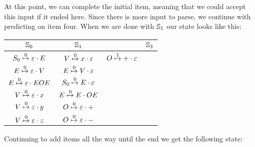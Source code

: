 		At this point, we can complete the initial item, meaning that we could 
		accept this input if it ended here. Since there is more input to parse,
		we continue with predicting on item four. When we are done with 
		$\St{1}$ our state looks like this:

		\begin{table}[H]
		\centering
		\begin{tabular}{|c|c|c|c|}
			\hline
			$\St{0}$                          & $\St{1}$                          &\St{2} & $\St{3}$ \\
			\hline
			$\earley{S_0}{\varepsilon}{E}{0}$ & $\earley{V}{x}{\varepsilon}{0}$   & $\earley{O}{+}{\varepsilon}{1}$ & \\
			$\earley{E}{\varepsilon}{V}{0}$   & $\earley{E}{V}{\varepsilon}{0}$   & & \\
			$\earley{E}{\varepsilon}{EOE}{0}$ & $\earley{S_0}{E}{\varepsilon}{0}$ & & \\
			$\earley{V}{\varepsilon}{x}{0}$   & $\earley{E}{E}{OE}{0}$            & & \\
			$\earley{V}{\varepsilon}{y}{0}$   & $\earley{O}{\varepsilon}{+}{0}$   & & \\
			$\earley{V}{\varepsilon}{z}{0}$   & $\earley{O}{\varepsilon}{-}{0}$   & & \\
			\hline
		\end{tabular}
		\end{table}
		
		Continuing to add items all the way until the end we get the following
		state:

